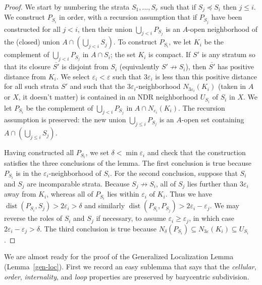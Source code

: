 \documentclass[psamsfonts]{amsart}
\theoremstyle{remark}
\DeclareMathOperator{\dist}{dist}
\begin{document}
\begin{proof}
We start by numbering the strata $S_1, \ldots, S_r$ such that if $S_j \preceq S_i$ then $j \leq i$.  We construct $P_{S_i}$ in order, with a recursion assumption that if $P_{S_j}$ have been constructed for all $j < i$, then their union $\bigcup_{j < i} P_{S_j}$ is an $A$-open neighborhood of the (closed) union $A \cap \left(\bigcup_{j < i} S_j \right)$.  To construct $P_{S_i}$, we let $K_i$ be the complement of $\bigcup_{j < i} P_{S_j}$ in $A \cap S_i$; the set $K_i$ is compact.  If $S'$ is any stratum so that its closure $\overline{S'}$ is disjoint from $S_i$ (equivalently $S' \not \rightarrow S_i$), then $\overline{S'}$ has positive distance from $K_i$.  We select $\varepsilon_i < \varepsilon$ such that $3\varepsilon_i$ is less than this positive distance for all such strata $S'$ and such that the $3\varepsilon_i$-neighborhood $N_{3\varepsilon_i}(K_i)$ (taken in $A$ or $X$, it doesn't matter) is contained in an NDR neighborhood $U_{S_i}$ of $S_i$ in $X$.  We let $P_{S_i}$ be the complement of $\bigcup_{j < i}P_{S_j}$ in $A \cap N_{\varepsilon_i}(K_i)$.  The recursion assumption is preserved: the new union $\bigcup_{j \leq i} P_{S_j}$ is an $A$-open set containing $A \cap \left(\bigcup_{j \leq i} S_j \right)$.

Having constructed all $P_{S_i}$, we set $\delta < \min \varepsilon_i$ and check that the construction satisfies the three conclusions of the lemma.  The first conclusion is true because $P_{S_i}$ is in the $\varepsilon_i$-neighborhood of $S_i$.  For the second conclusion, suppose that $S_i$ and $S_j$ are incomparable strata.  Because $S_j \not\rightarrow S_i$, all of $S_j$ lies further than $3\varepsilon_i$ away from $K_i$, whereas all of $P_{S_i}$ lies within $\varepsilon_i$ of $K_i$.  Thus we have $\dist(P_{S_i}, S_j) > 2\varepsilon_i > \delta$ and similarly $\dist(P_{S_i}, P_{S_j}) > 2\varepsilon_i - \varepsilon_j$.   We may reverse the roles of $S_i$ and $S_j$ if necessary, to assume $\varepsilon_i \geq \varepsilon_j$, in which case $2\varepsilon_i - \varepsilon_j > \delta$.  The third conclusion is true because $N_{\delta}(P_{S_i}) \subseteq N_{3\varepsilon}(K_i) \subseteq U_{S_i}$.
\end{proof}

We are almost ready for the proof of the Generalized Localization Lemma (Lemma~\ref{gen-loc}).  First we record an easy sublemma that says that the \emph{cellular}, \emph{order}, \emph{internality}, and \emph{loop} properties are preserved by barycentric subdivision.
\end{document}
